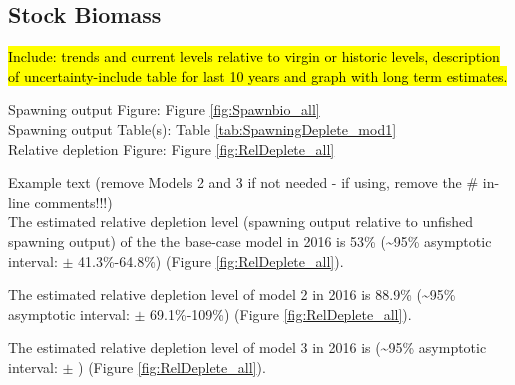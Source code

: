 \documentclass[12pt,]{article}
\begin{document}
\FloatBarrier

\subsection*{Stock Biomass}\label{stock-biomass}

\hl{Include: trends and current levels relative to virgin or historic levels, 
description of uncertainty-include table for last 10 years and graph with 
long term estimates.}

Spawning output Figure: Figure \ref{fig:Spawnbio_all}\\
Spawning output Table(s): Table \ref{tab:SpawningDeplete_mod1}\\
Relative depletion Figure: Figure \ref{fig:RelDeplete_all}

Example text (remove Models 2 and 3 if not needed - if using, remove the
\# in-line comments!!!)\\
The estimated relative depletion level (spawning output relative to
unfished spawning output) of the the base-case model in 2016 is 53\%
(\textasciitilde{}95\% asymptotic interval: \(\pm\) 41.3\%-64.8\%)
(Figure \ref{fig:RelDeplete_all}).

The estimated relative depletion level of model 2 in 2016 is 88.9\%
(\textasciitilde{}95\% asymptotic interval: \(\pm\) 69.1\%-109\%)
(Figure \ref{fig:RelDeplete_all}).

The estimated relative depletion level of model 3 in 2016 is
(\textasciitilde{}95\% asymptotic interval: \(\pm\) ) (Figure
\ref{fig:RelDeplete_all}).

\FloatBarrier
\end{document}

